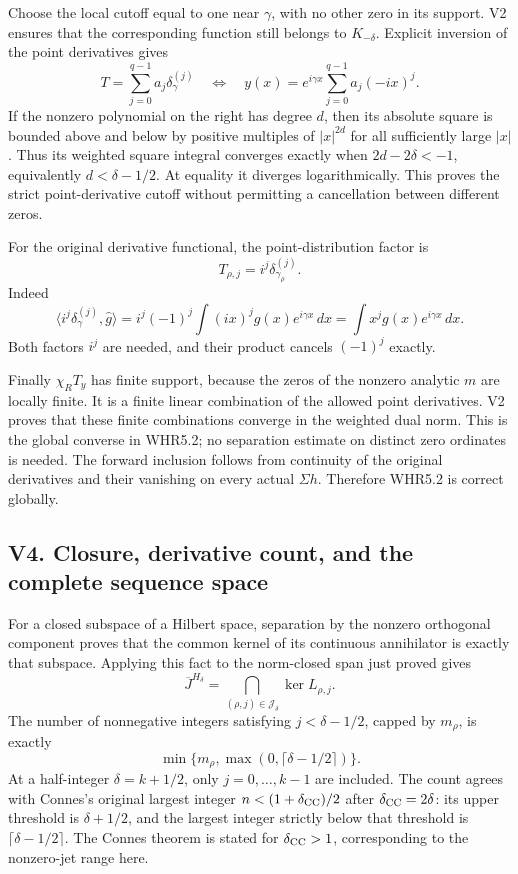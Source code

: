 Choose the local cutoff equal to one near \(\gamma\), with no other zero
in its support. V2 ensures that the corresponding function still belongs
to \(K_{-\delta}\). Explicit inversion of the point derivatives gives \[
T=\sum_{j=0}^{q-1}a_j\delta_\gamma^{(j)}
\quad\Longleftrightarrow\quad
y(x)=e^{i\gamma x}\sum_{j=0}^{q-1}a_j(-ix)^j.
\] If the nonzero polynomial on the right has degree \(d\), then its
absolute square is bounded above and below by positive multiples of
\(|x|^{2d}\) for all sufficiently large \(|x|\). Thus its weighted
square integral converges exactly when \(2d-2\delta<-1\), equivalently
\(d<\delta-1/2\). At equality it diverges logarithmically. This proves
the strict point-derivative cutoff without permitting a cancellation
between different zeros.

For the original derivative functional, the point-distribution factor is
\[
T_{\rho,j}=i^j\delta_{\gamma_\rho}^{(j)}.
\] Indeed \[
\langle i^j\delta_{\gamma}^{(j)},\widehat g\rangle
=i^j(-1)^j\int (ix)^jg(x)e^{i\gamma x}\,dx
=\int x^jg(x)e^{i\gamma x}\,dx.
\] Both factors \(i^j\) are needed, and their product cancels \((-1)^j\)
exactly.

Finally \(\chi_RT_y\) has finite support, because the zeros of the
nonzero analytic \(m\) are locally finite. It is a finite linear
combination of the allowed point derivatives. V2 proves that these
finite combinations converge in the weighted dual norm. This is the
global converse in WHR5.2; no separation estimate on distinct zero
ordinates is needed. The forward inclusion follows from continuity of
the original derivatives and their vanishing on every actual
\(\Sigma h\). Therefore WHR5.2 is correct globally.

\subsection{V4. Closure, derivative count, and the complete sequence
space}\label{v4.-closure-derivative-count-and-the-complete-sequence-space}

For a closed subspace of a Hilbert space, separation by the nonzero
orthogonal component proves that the common kernel of its continuous
annihilator is exactly that subspace. Applying this fact to the
norm-closed span just proved gives \[
\overline J^{H_\delta}
=\bigcap_{(\rho,j)\in\mathscr J_\delta}\ker L_{\rho,j}.
\] The number of nonnegative integers satisfying \(j<\delta-1/2\),
capped by \(m_\rho\), is exactly \[
\min\{m_\rho,\max(0,\lceil\delta-1/2\rceil)\}.
\] At a half-integer \(\delta=k+1/2\), only \(j=0,\ldots,k-1\) are
included. The count agrees with Connes's original largest integer
\(n<(1+\delta_{\rm CC})/2\) after \(\delta_{\rm CC}=2\delta\): its upper
threshold is \(\delta+1/2\), and the largest integer strictly below that
threshold is \(\lceil\delta-1/2\rceil\). The Connes theorem is stated
for \(\delta_{\rm CC}>1\), corresponding to the nonzero-jet range here.


